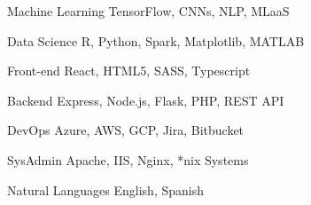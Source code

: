 

\begin{cvskills}

  \cvskill
    {Machine Learning} %
    {TensorFlow, CNNs, NLP, MLaaS} %

  \cvskill
    {Data Science} %
    {R, Python, Spark, Matplotlib, MATLAB} %

  \cvskill
    {Front-end} %
    {React, HTML5, SASS, Typescript} %

  \cvskill
    {Backend} %
    {Express, Node.js, Flask, PHP, REST API} %

  \cvskill
    {DevOps} %
    {Azure, AWS, GCP, Jira, Bitbucket} %

  \cvskill
    {SysAdmin} %
    {Apache, IIS, Nginx, *nix Systems} %

  \cvskill
    {Natural Languages} %
    {English, Spanish} %

\end{cvskills}
